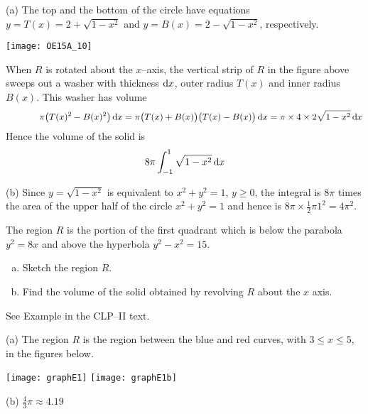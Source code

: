 \begin{solution} (a)
The top and the bottom of the circle have equations
$y=T(x)=2+\sqrt{1-x^2}$ and $y=B(x) = 2-\sqrt{1-x^2}$, respectively.

\smallskip
\centerline{\texttt{[image: OE15A\_10]}}
\smallskip

\noindent
When $R$ is rotated about the $x$--axis, the vertical strip of
$R$ in the figure above sweeps out a washer with thickness $\mathrm{d}x$,
outer radius $T(x)$ and inner radius $B(x)$. This washer has
volume
\begin{equation*}
\null\hskip0.5in\pi\big(T(x)^2- B(x)^2\big)\,\dee{x}
= \pi\big(T(x)+ B(x)\big)\big(T(x)- B(x)\big)\,\dee{x}
= \pi\times 4\times 2\sqrt{1-x^2}\,\dee{x}
\end{equation*}
Hence the volume of the solid is
\begin{equation*}
8\pi\int_{-1}^1\sqrt{1-x^2}\,\mathrm{d}x
\end{equation*}

\noindent (b)
Since $y=\sqrt{1-x^2}$ is equivalent to $x^2+y^2=1$, $y\ge 0$,
the integral is $8\pi$ times the area of the upper half
of the circle $x^2+y^2=1$ and hence is
$8\pi\times \frac{1}{2}\pi 1^2 = 4\pi^2$.


\end{solution}

\begin{question}[1996D] %
 The region $R$ is the portion of the first quadrant which
is below the parabola $y^2=8x$ and above the hyperbola $y^2-x^2=15$.
\begin{enumerate}[(a)]
\item
Sketch the region $R$.
\item
Find the volume of the solid obtained by revolving $R$ about the $x$ axis.
\end{enumerate}
\end{question}

\begin{hint}
See Example  in the
CLP--II text.
\end{hint}

\begin{answer} (a)
The region $R$ is the region
between the blue and red curves, with $3\le x\le 5$,  in the figures below.

\begin{center}
       \texttt{[image: graphE1]}\qquad
       \texttt{[image: graphE1b]}
\end{center}

\noindent (b) $\frac{4}{3}\pi\approx 4.19$
\end{answer}

